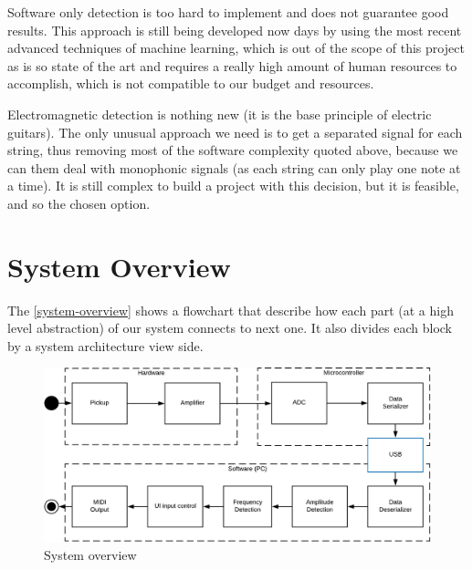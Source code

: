 Software only detection is too hard to implement and does not guarantee good results.
This approach is still being developed now days by using the most recent advanced
techniques of machine learning, which is out of the scope of this project as is so
state of the art and requires a really high amount of human resources to accomplish,
which is not compatible to our budget and resources. 

Electromagnetic detection is nothing new (it is the base principle of electric guitars).
The only unusual approach we need is to get a separated signal for each string, thus
removing most of the software complexity quoted above, because we can them deal
with monophonic signals (as each string can only play one note at a time). It is
still complex to build a project with this decision, but it is feasible, and so
the chosen option.

\section{System Overview}
The \autoref{system-overview} shows a flowchart that describe how each part
(at a high level abstraction) of our system connects to next one. It also divides
each block by a system architecture view side.

\begin{figure}[!htpb]
  \centering
  \caption{System overview}
  \label{system-overview}
  \includegraphics[scale=0.85]{images/system-overview}
\end{figure}